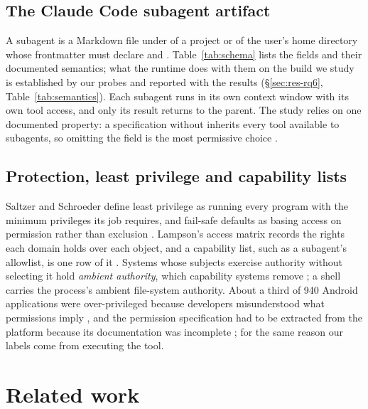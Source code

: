 \subsection{The Claude Code subagent artifact}
\label{sec:bg-artifact}
A subagent is a Markdown file under  of a project or of the user's home directory whose
frontmatter must declare  and  \citep{AnthropicSubagentsDoc}. Table~\ref{tab:schema}
lists the fields and their documented semantics; what the runtime does with them on the build we study is established
by our probes and reported with the results (\S\ref{sec:res-rq6}, Table~\ref{tab:semantics}). Each subagent runs in its
own context window with its own tool access, and only its result returns to the parent. The study relies on one
documented property: a specification without  inherits every tool available to subagents, so omitting the
field is the most permissive choice \citep{AnthropicSubagentsDoc}.



\subsection{Protection, least privilege and capability lists}
\label{sec:bg-protection}
Saltzer and Schroeder define least privilege as running every program with the minimum privileges its job requires,
and fail-safe defaults as basing access on permission rather than exclusion \citep[\S I-A-3]{saltzer1975protection}.
Lampson's access matrix records the rights each domain holds over each object, and a capability list, such as a
subagent's allowlist, is one row of it \citep{lampson1974protection}. Systems whose subjects exercise authority without
selecting it hold \emph{ambient authority}, which capability systems remove
\citep{miller2003capability,watson2010capsicum}; a shell carries the process's ambient file-system authority. About a third of 940 Android applications were over-privileged because developers misunderstood what permissions
imply \citep{felt2011android}, and the permission specification had to be extracted from the platform because its
documentation was incomplete \citep{au2012pscout}; for the same reason our labels come from executing the tool.

\section{Related work}
\label{sec:related}

